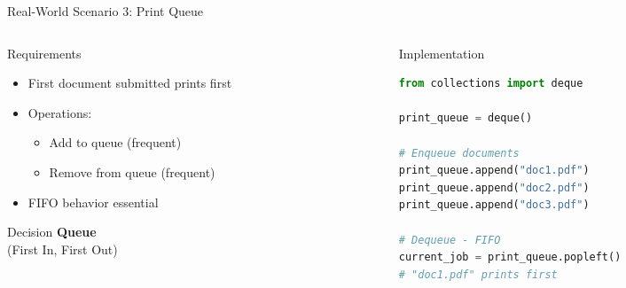 \documentclass[aspectratio=169,xcolor=dvipsnames]{beamer}
\begin{document}
\begin{frame}[fragile]{Real-World Scenario 3: Print Queue}
  \begin{columns}
    \begin{column}{0.48\textwidth}
      \begin{block}{Requirements}
        \begin{itemize}
          \item First document submitted prints first
          \item Operations:
            \begin{itemize}
              \item Add to queue (frequent)
              \item Remove from queue (frequent)
            \end{itemize}
          \item FIFO behavior essential
        \end{itemize}
      \end{block}

      \vspace{0.3cm}

      \begin{alertblock}{Decision}
        \textbf{Queue} \\
        (First In, First Out)
      \end{alertblock}
    \end{column}
    \begin{column}{0.48\textwidth}
      \begin{exampleblock}{Implementation}
        \begin{lstlisting}[language=Python,basicstyle=\small\ttfamily]
from collections import deque

print_queue = deque()

# Enqueue documents
print_queue.append("doc1.pdf")
print_queue.append("doc2.pdf")
print_queue.append("doc3.pdf")

# Dequeue - FIFO
current_job = print_queue.popleft()
# "doc1.pdf" prints first
        \end{lstlisting}
      \end{exampleblock}
    \end{column}
  \end{columns}
\end{frame}
\end{document}
